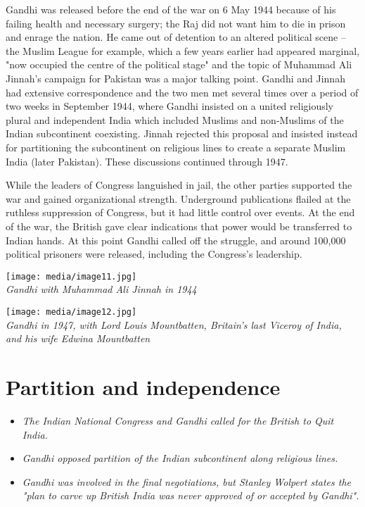 Gandhi was released before the end of the war on 6 May 1944 because of
his failing health and necessary surgery; the Raj did not want him to
die in prison and enrage the nation. He came out of detention to an
altered political scene -- the Muslim League for example, which a few
years earlier had appeared marginal, "now occupied the centre of the
political stage" and the topic of Muhammad Ali Jinnah's campaign for
Pakistan was a major talking point. Gandhi and Jinnah had extensive
correspondence and the two men met several times over a period of two
weeks in September 1944, where Gandhi insisted on a united religiously
plural and independent India which included Muslims and non-Muslims of
the Indian subcontinent coexisting. Jinnah rejected this proposal and
insisted instead for partitioning the subcontinent on religious lines to
create a separate Muslim India (later Pakistan). These discussions
continued through 1947.

While the leaders of Congress languished in jail, the other parties
supported the war and gained organizational strength. Underground
publications flailed at the ruthless suppression of Congress, but it had
little control over events. At the end of the war, the British gave
clear indications that power would be transferred to Indian hands. At
this point Gandhi called off the struggle, and around 100,000 political
prisoners were released, including the Congress's leadership.

\texttt{[image: media/image11.jpg]}\\
\emph{Gandhi with Muhammad Ali Jinnah in 1944}

\texttt{[image: media/image12.jpg]}\\
\emph{Gandhi in 1947, with Lord Louis Mountbatten, Britain's last
Viceroy of India, and his wife Edwina Mountbatten}

\section{Partition and independence}\label{partition-and-independence}

\begin{itemize}
\item
  \emph{The Indian National Congress and Gandhi called for the British
  to Quit India.}
\item
  \emph{Gandhi opposed partition of the Indian subcontinent along
  religious lines.}
\item
  \emph{Gandhi was involved in the final negotiations, but Stanley
  Wolpert states the "plan to carve up British India was never approved
  of or accepted by Gandhi".}
\end{itemize}

